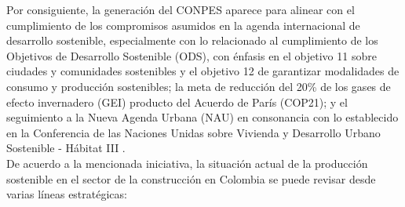 \documentclass[12pt]{article}
\begin{document}
Por consiguiente, la generación del CONPES aparece para alinear con el cumplimiento de los compromisos asumidos en la agenda internacional de desarrollo sostenible, especialmente con lo relacionado al cumplimiento de los Objetivos de Desarrollo Sostenible (ODS), con énfasis en el objetivo 11 sobre ciudades y comunidades sostenibles y el objetivo 12 de garantizar modalidades de consumo y producción sostenibles; la meta de reducción del 20\% de los gases de efecto invernadero (GEI) producto del Acuerdo de París (COP21); y el seguimiento a la Nueva Agenda Urbana (NAU) en consonancia con lo establecido en la Conferencia de las Naciones Unidas sobre Vivienda y Desarrollo Urbano Sostenible - Hábitat III \citep{conpes2018}.\\

De acuerdo a la mencionada iniciativa, la situación actual de la producción sostenible en el sector de la construcción en  Colombia se puede revisar desde varias líneas estratégicas: 
\end{document}
